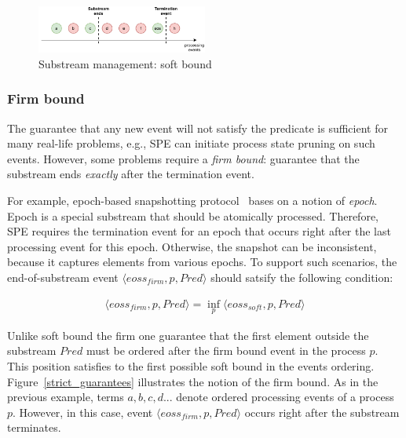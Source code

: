 \begin{figure}[htbp]
  \centering
  \includegraphics[width=0.50\textwidth]{pics/general-guarantee.pdf}
  \caption{Substream management: soft bound}
  \label{general_guarantees}
\end{figure}

\subsubsection{Firm bound}

The guarantee that any new event will not satisfy the predicate is sufficient for many real-life problems, e.g., SPE can initiate process state pruning on such events. However, some problems require a {\em firm bound}: guarantee that the substream ends {\em exactly} after the termination event. 

For example, epoch-based snapshotting protocol~\cite{2015arXiv150608603C, jacques2016consistent} bases on a notion of {\em epoch}. Epoch is a special substream that should be atomically processed. Therefore, SPE requires the termination event for an epoch that occurs right after the last processing event for this epoch. Otherwise, the snapshot can be inconsistent, because it captures elements from various epochs. To support such scenarios, the end-of-substream event $\langle eoss_{firm}, p, Pred\rangle$ should satsify the following condition:

\begin{equation}\begin{array}{l}
\langle eoss_{firm}, p, Pred\rangle = \inf_{p} \langle eoss_{soft}, p, Pred\rangle
\end{array}\end{equation}

Unlike soft bound the firm one guarantee that the first element outside the substream $Pred$ must be ordered after the firm bound event in the process $p$. This position satisfies to the first possible soft bound in the events ordering. Figure~\ref{strict_guarantees} illustrates the notion of the firm bound. As in the previous example, terms $a,b,c,d...$ denote ordered processing events of a process $p$. However, in this case, event $\langle eoss_{firm}, p, Pred\rangle$ occurs right after the substream terminates.

